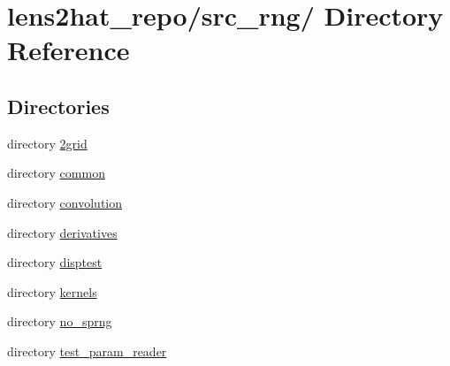 \section{lens2hat\-\_\-repo/src\-\_\-rng/ Directory Reference}
\label{dir_aef67e3e4769f69e7caf56db0e8a1f45}
\subsection*{Directories}
\begin{DoxyCompactItemize}
\item 
directory \hyperlink{dir_a3a92a38e8597ccba9093f598aa1280a}{2grid}
\item 
directory \hyperlink{dir_88e96303b79e61c75f31dec8de0189e7}{common}
\item 
directory \hyperlink{dir_37b90dd4c1aa120b15927da5e6db5faa}{convolution}
\item 
directory \hyperlink{dir_07c718bbf579f325adf09849b69d463f}{derivatives}
\item 
directory \hyperlink{dir_9be02230c9667e2b031126f403294414}{disptest}
\item 
directory \hyperlink{dir_d206cab9e8e7697e0a5db818fc489fba}{kernels}
\item 
directory \hyperlink{dir_96f87f081db03cfad979ed32056ab637}{no\-\_\-sprng}
\item 
directory \hyperlink{dir_a59f438bf73ac9ad1cd2df601a7bbed1}{test\-\_\-param\-\_\-reader}
\end{DoxyCompactItemize}

